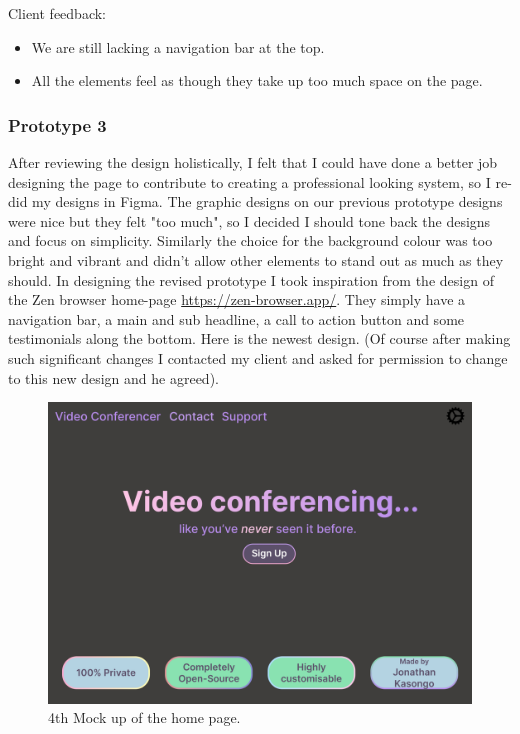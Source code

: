 {\color{gray} \hrulefill} \vspace{0.2cm}

{\sffamily Client feedback:}

\begin{itemize}
  \item We are still lacking a navigation bar at the top.
  \item All the elements feel as though they take up too much space on the page.
\end{itemize}

{\color{gray} \hrulefill} 

\subsubsection{Prototype 3}

After reviewing the design holistically, I felt that I could 
have done a better job designing the page to contribute to 
creating a professional looking system, so I re-did my 
designs in Figma. The graphic designs on our previous 
prototype designs were nice but they felt "too much",
so I decided I should tone back the designs and focus on 
simplicity. Similarly the choice for the background colour
was too bright and vibrant and didn't allow other elements 
to stand out as much as they should. In designing the revised 
prototype I took inspiration from the design of the 
Zen browser home-page \url{https://zen-browser.app/}. They 
simply have a navigation bar, a main and sub headline, a call
to action button and some testimonials along the bottom. Here
is the newest design. (Of course after making such significant
changes I contacted my client and asked for permission to
change to this new design and he agreed).

\begin{figure}[H]
\centering

\includegraphics[scale=0.2]{Images/HomeUI_4.png}

\caption{4th Mock up of the home page.}
\end{figure}

